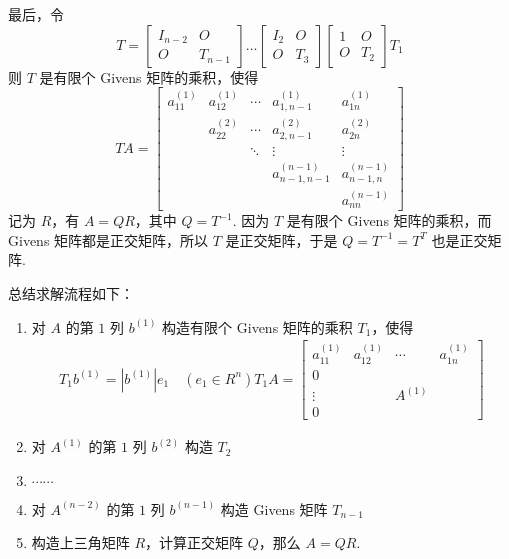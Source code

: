             最后，令
            \begin{equation*}
                T = \begin{bmatrix}
                    I_{n-2} & O \\ O & T_{n-1} 
                \end{bmatrix} \dots \begin{bmatrix}
                    I_2 & O \\ O & T_3
                \end{bmatrix} \begin{bmatrix}
                    1 & O \\ O & T_2
                \end{bmatrix} T_1
            \end{equation*}
            则 $T$ 是有限个 Givens 矩阵的乘积，使得
            \begin{equation*}
                TA = \begin{bmatrix}
                    a_{11}^{(1)} & a_{12}^{(1)} & \cdots & a_{1,n-1}^{(1)} & a_{1n}^{(1)} \\ & a_{22}^{(2)} & \cdots &a_{2,n-1}^{(2)} & a_{2n}^{(2)} \\ & & \ddots & \vdots & \vdots \\ & & & a_{n-1,n-1}^{(n-1)} & a_{n-1,n}^{(n-1)} \\ & & & & a_{nn}^{(n-1)}
                \end{bmatrix}
            \end{equation*}
            记为 $R$，有 $A = QR$，其中 $Q = T^{-1}$. 因为 $T$ 是有限个 Givens 矩阵的乘积，而 Givens 矩阵都是正交矩阵，所以 $T$ 是正交矩阵，于是 $Q = T^{-1} = T^T$ 也是正交矩阵.
            \par 总结求解流程如下：
            \begin{enumerate}
                \item 对 $A$ 的第 $1$ 列 $b^{(1)}$ 构造有限个 Givens 矩阵的乘积 $T_1$，使得
                    \begin{align*}
                        T_1b^{(1)} = |b^{(1)}|e_1 \quad (e_1 \in R^n)
                        T_1A = \begin{bmatrix}
                            a_{11}^{(1)} &  a_{12}^{(1)} & \cdots &  a_{1n}^{(1)} \\ 0 & & & \\ \vdots & & A^{(1)} & \\ 0 & & & 
                        \end{bmatrix}
                    \end{align*}
                \item 对 $A^{(1)}$ 的第 $1$ 列 $b^{(2)}$ 构造 $T_2$
                \item $\cdots \cdots$
                \item 对 $A^{(n-2)}$ 的第 $1$ 列 $b^{(n-1)}$ 构造 Givens 矩阵 $T_{n-1}$
                \item 构造上三角矩阵 $R$，计算正交矩阵 $Q$，那么 $A = QR$.
            \end{enumerate}
